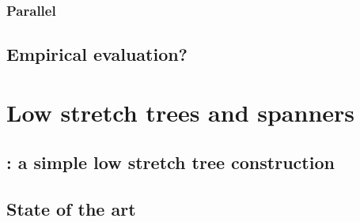 \documentclass[nobib, a4paper, 10pt, oneside, onecolumn, openany, notitlepage, final,
svgnames, marginals=raggedouter, english,
]{article}
\begin{document}
\subsubsection{Parallel \pcc{}}
\label{ssub:parallel_cc}

\subsection{Empirical evaluation?}
\label{sub:cc_empiracal_evaluation}

\section{Low stretch trees and spanners}
\label{sec:low_stretch_trees_and_spanners}

\subsection{\gtx{}: a simple low stretch tree construction}
\label{sub:gtx_a_simple_low_stretch_tree_construction}



\subsection{State of the art}
\label{sub:gtx_state_of_the_art}

\iffalse
\url{http://www.siam.org/meetings/da17/schedule.html} SODA 13B \url{http://dl.acm.org/citation.cfm?id=3039686}
for instance the Elkin paper \enquote{Our centralized randomized algorithm computes (with
probability close to 1), a $(2k - 1)$-spanner with $n \cdot (1 + O(\frac{\log k}{n}))$ edges in
$O(|E|)$ time, whenever $k = \Omega(\log n)$. Note that when $k = \omega(\log n)$, the number of
edges is $n(1+o(1))$, i.e., in this range the algorithm computes an ultra-sparse spanner in $O(|E|)$
time.} For instance, if $k=5\log n$, we get a $10\log n$-spanner with $n\left(1+O\left(\frac{\log\log
n}{n}\right)\right)$ edges in $O(|E|)$ time.

While they have many applications [see first paragraph of \url{https://arxiv.org/pdf/1401.2454.pdf},
which was later merged in a STOC'14 paper] (a major one being solving linear system), in some
practical situations their advantages are less clear [from
\url{https://link.springer.com/chapter/10.1007/978-3-319-20086-6_16}\enquote{for reasonable inputs
the constant factors make the solver much slower than methods with higher asymptotic complexity.
One other aspect predicted by theory is confirmed by our findings: Spanning trees with lower
stretch indeed reduce the solver's running time. Yet, simple spanning tree algorithms perform
better in practice than those with a guaranteed low stretch.} this is improved by
\url{https://link.springer.com/chapter/10.1007%2F978-3-319-20086-6_17} although they seem to work
	mostly with the Laplacian of the tree ]
\fi
\end{document}
